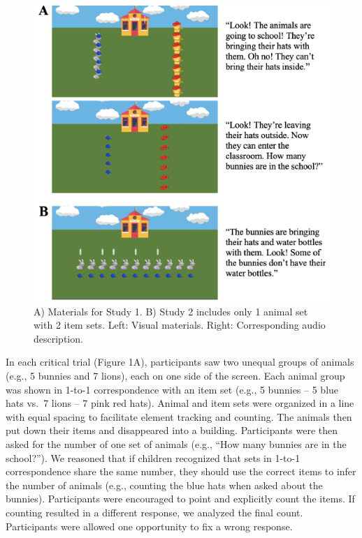 \documentclass[10pt, letterpaper]{article}
\newenvironment{CodeChunk}{}{}
\begin{document}
\begin{CodeChunk}
\begin{figure}[h]

{\centering \includegraphics{figs/task_schematic-1} 

}

\caption[A) Materials for Study 1]{A) Materials for Study 1. B) Study 2 includes only 1 animal set with 2 item sets. Left: Visual materials. Right: Corresponding audio description.}\label{fig:task_schematic}
\end{figure}
\end{CodeChunk}

In each critical trial (Figure 1A), participants saw two unequal groups
of animals (e.g., 5 bunnies and 7 lions), each on one side of the
screen. Each animal group was shown in 1-to-1 correspondence with an
item set (e.g., 5 bunnies -- 5 blue hats vs.~7 lions -- 7 pink red
hats). Animal and item sets were organized in a line with equal spacing
to facilitate element tracking and counting. The animals then put down
their items and disappeared into a building. Participants were then
asked for the number of one set of animals (e.g., ``How many bunnies are
in the school?''). We reasoned that if children recognized that sets in
1-to-1 correspondence share the same number, they should use the correct
items to infer the number of animals (e.g., counting the blue hats when
asked about the bunnies). Participants were encouraged to point and
explicitly count the items. If counting resulted in a different
response, we analyzed the final count. Participants were allowed one
opportunity to fix a wrong response.
\end{document}
